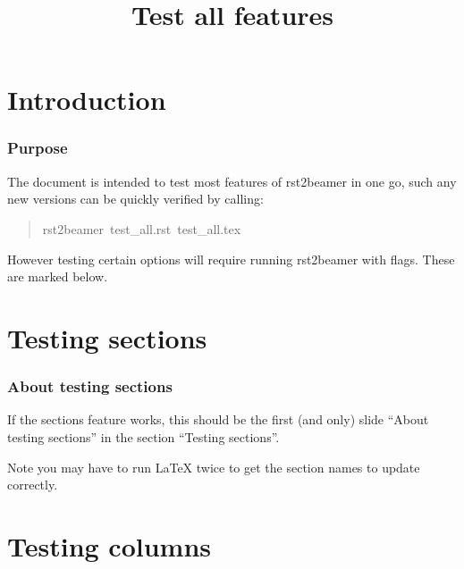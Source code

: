 \documentclass[t]{beamer}
\begin{document}
\title[Test all features]{Test all features%
  \label{test-all-features}}
\author[]{}
\date{}
\maketitle


\section{Introduction%
  \label{introduction}%
}

\begin{frame}[fragile]
\frametitle{Purpose}


The document is intended to test most features of rst2beamer in one go, such
any new versions can be quickly verified by calling:
%
\begin{quote}{\ttfamily \raggedright \noindent
rst2beamer~test\_all.rst~test\_all.tex
}
\end{quote}

However testing certain options will require running rst2beamer with flags.
These are marked below.

\end{frame}


\section{Testing sections%
  \label{testing-sections}%
}

\begin{frame}[fragile]
\frametitle{About testing sections}


If the sections feature works, this should be the first (and only) slide
``About testing sections'' in the section ``Testing sections''.

Note you may have to run LaTeX twice to get the section names to update
correctly.

\end{frame}


\section{Testing columns%
  \label{testing-columns}%
}
\end{document}
